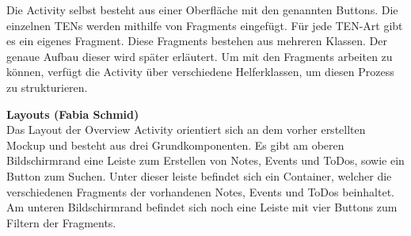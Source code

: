 Die Activity selbst besteht aus einer Oberfläche mit den genannten Buttons. Die einzelnen TENs werden mithilfe von Fragments eingefügt. Für jede TEN-Art gibt es ein eigenes Fragment. Diese Fragments bestehen aus mehreren Klassen. Der genaue Aufbau dieser wird später erläutert. Um mit den Fragments arbeiten zu können, verfügt die Activity über verschiedene Helferklassen, um diesen Prozess zu strukturieren.


\textbf{Layouts (Fabia Schmid)}\\
Das Layout der Overview Activity orientiert sich an dem vorher erstellten Mockup und besteht aus drei Grundkomponenten. Es gibt am oberen Bildschirmrand eine Leiste zum Erstellen von Notes, Events und ToDos, sowie ein Button zum Suchen. Unter dieser leiste befindet sich ein Container, welcher die verschiedenen Fragments der vorhandenen Notes, Events und ToDos beinhaltet. Am unteren Bildschirmrand befindet sich noch eine Leiste mit vier Buttons zum Filtern der  Fragments.

